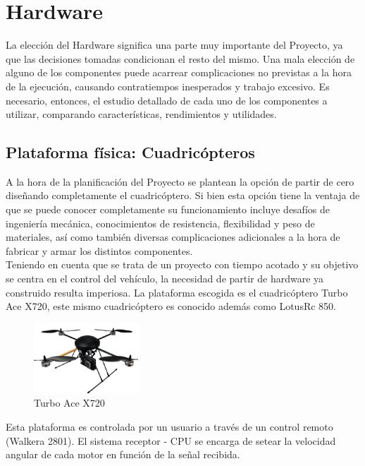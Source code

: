 \documentclass[main]{subfiles}
\begin{document}
\chapter{Hardware}
La elecci\'on del Hardware significa una parte muy importante del Proyecto, ya que las decisiones tomadas condicionan el resto del mismo. Una mala elecci\'on de alguno de los componentes puede acarrear complicaciones no previstas a la hora de la ejecuci\'on, causando contratiempos inesperados y trabajo excesivo. Es necesario, entonces, el estudio detallado de cada uno de los componentes a utilizar, comparando caracter\'isticas, rendimientos y utilidades.\\



\section{Plataforma f\'isica: Cuadric\'opteros}


A la hora de la planificaci\'on del Proyecto se plantean la opci\'on de partir de cero dise\~nando completamente el cuadric\'optero. Si bien esta opci\'on tiene la ventaja de que se puede conocer completamente su funcionamiento incluye desaf\'ios de ingenier\'ia mec\'anica, conocimientos de resistencia, flexibilidad y peso de materiales, as\'i como tambi\'en diversas complicaciones adicionales a la hora de fabricar y armar los distintos componentes. \\

Teniendo en cuenta que se trata de un proyecto con tiempo acotado y su objetivo se centra en el control del veh\'iculo, la necesidad de partir de hardware ya construido resulta imperiosa. La plataforma escogida es el cuadric\'optero Turbo Ace X720, este mismo cuadric\'optero es conocido adem\'as como LotusRc 850.\\

\begin{figure}
	\centering
	\includegraphics[width=0.35\textwidth]{./pics_eleccion_hardware/turboace.png}
	\caption{Turbo Ace X720}
	\label{fig:cuadricoptero}
\end{figure}


Esta plataforma es controlada por un usuario a trav\'es de un control remoto (Walkera 2801). El sistema receptor - CPU se encarga de setear la velocidad angular de cada motor en funci\'on de la se\~nal recibida. 
\end{document}
